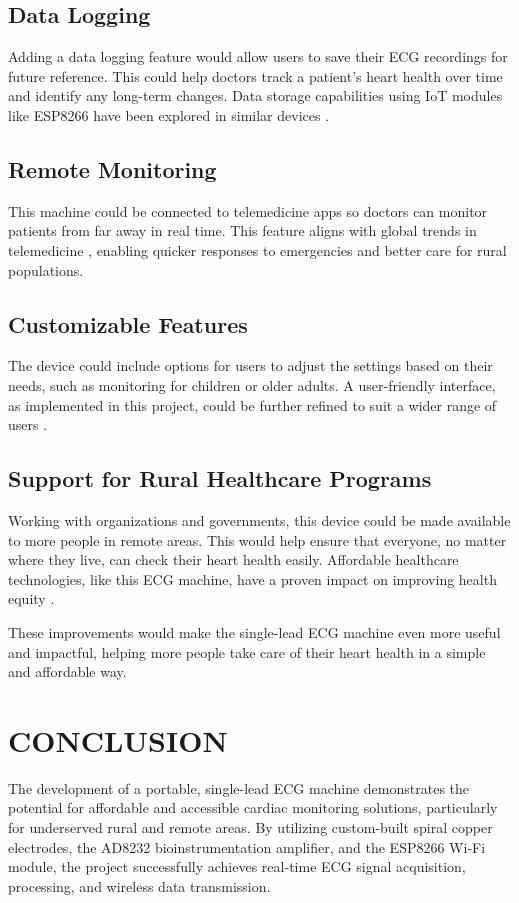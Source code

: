 \section{Data Logging}
Adding a data logging feature would allow users to save their ECG recordings for future reference. This could help doctors track a patient’s heart health over time and identify any long-term changes. Data storage capabilities using IoT modules like ESP8266 have been explored in similar devices \cite{Espressif2015}.

\section{Remote Monitoring}
This machine could be connected to telemedicine apps so doctors can monitor patients from far away in real time. This feature aligns with global trends in telemedicine \cite{Arias2016}, enabling quicker responses to emergencies and better care for rural populations.

\section{Customizable Features}
The device could include options for users to adjust the settings based on their needs, such as monitoring for children or older adults. A user-friendly interface, as implemented in this project, could be further refined to suit a wider range of users \cite{Mozilla2024}.

\section{Support for Rural Healthcare Programs}
Working with organizations and governments, this device could be made available to more people in remote areas. This would help ensure that everyone, no matter where they live, can check their heart health easily. Affordable healthcare technologies, like this ECG machine, have a proven impact on improving health equity \cite{Parker2019}.

These improvements would make the single-lead ECG machine even more useful and impactful, helping more people take care of their heart health in a simple and affordable way.



\chapter{CONCLUSION}
The development of a portable, single-lead ECG machine demonstrates the potential for affordable and accessible cardiac monitoring solutions, particularly for underserved rural and remote areas. By utilizing custom-built spiral copper electrodes, the AD8232 bioinstrumentation amplifier, and the ESP8266 Wi-Fi module, the project successfully achieves real-time ECG signal acquisition, processing, and wireless data transmission.

